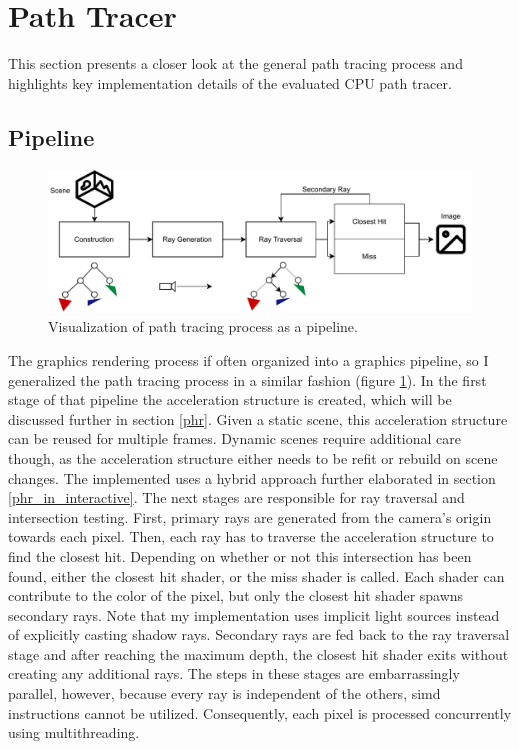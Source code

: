 \section{Path Tracer}
\label{path_tracer}
This section presents a closer look at the general path tracing process and highlights key implementation details of the evaluated CPU path tracer.
\subsection{Pipeline}
\begin{figure}[H]
    \centering
    \includegraphics[width=400pt]{images/ray_trcing_pipeline.pdf}
    \caption{Visualization of path tracing process as a pipeline.}
    \label{fig:ray_pipeline}
\end{figure}
The graphics rendering process if often organized into a graphics pipeline\cite{sugerman09gramps}, so I generalized the path tracing process in a similar fashion (figure \ref{fig:ray_pipeline}). In the first stage of that pipeline the acceleration structure is created, which will be discussed further in section \ref{phr}. Given a static scene, this acceleration structure can be reused for multiple frames. Dynamic scenes require additional care though, as the acceleration structure either needs to be refit or rebuild on scene changes. The implemented uses a hybrid approach further elaborated in section \ref{phr_in_interactive}. The next stages are responsible for ray traversal and intersection testing. First, primary rays are generated from the camera's origin towards each pixel. Then, each ray has to traverse the acceleration structure to find the closest hit. Depending on whether or not this intersection has been found, either the closest hit shader, or the miss shader is called. Each shader can contribute to the color of the pixel, but only the closest hit shader spawns secondary rays. Note that my implementation uses implicit light sources instead of explicitly casting shadow rays. Secondary rays are fed back to the ray traversal stage and after reaching the maximum depth, the closest hit shader exits without creating any additional rays. The steps in these stages are embarrassingly parallel, however, because every ray is independent of the others, \acrshort{simd} instructions cannot be utilized. Consequently, each pixel is processed concurrently using multithreading.
